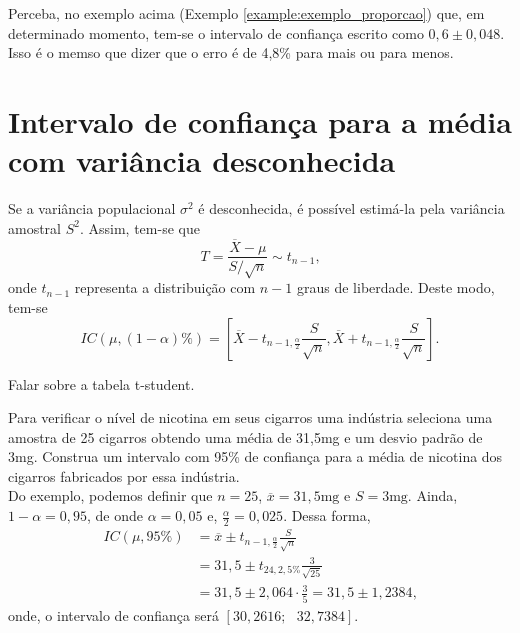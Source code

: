 \documentclass[11pt,fleqn]{book}
\numberwithin{mpicture}{chapter}
\numberwithin{mtable}{chapter}
\numberwithin{mframe}{chapter}
\begin{document}
\begin{remark}
	Perceba, no exemplo acima (Exemplo \ref{example:exemplo_proporcao}) que, em determinado momento, tem-se o intervalo de confiança escrito como $0,6\pm 0,048$. Isso é o memso que dizer que o erro é de 4,8\% para mais ou para menos.
\end{remark}

\section{Intervalo de confiança para a média com variância desconhecida}

Se a variância populacional $\sigma^2$ é desconhecida, é possível estimá-la pela variância amostral $S^2$. Assim, tem-se que
\[
	T=\frac{\overline{X}-\mu}{S/\sqrt{n}} \sim t_{n-1}\text{,}
\]
onde $t_{n-1}$ representa a distribuição  com $n-1$ graus de liberdade. Deste modo, tem-se
\[
	IC(\mu, (1-\alpha)\%) = \left [
		\overline{X} - t_{n-1,\frac{\alpha}{2}}\frac{S}{\sqrt{n}}
		,
		\overline{X} + t_{n-1,\frac{\alpha}{2}}\frac{S}{\sqrt{n}}
	\right ]
	\text{.}
\]

{\color{red}Falar sobre a tabela t-student.}

\begin{example}
	Para verificar o nível de nicotina em seus cigarros uma indústria seleciona uma amostra de 25 cigarros obtendo uma média de 31,5mg e um desvio padrão de 3mg. Construa um intervalo com 95\% de confiança para a média de nicotina dos cigarros fabricados por essa indústria.\\
	
	Do exemplo, podemos definir que $n=25$, $\overline{x}=31,5\text{mg}$ e $S=3\text{mg}$. Ainda, $1-\alpha=0,95$, de onde $\alpha=0,05$ e, $\frac{\alpha}{2}=0,025$. Dessa forma,
	\begin{align*}
		IC(\mu,95\%)&=\overline{x}\pm t_{n-1,\frac{\alpha}{2}}\frac{S}{\sqrt{n}}\\
					&=31,5\pm t_{24,2,5\%}\frac{3}{\sqrt{25}}\\
					&=31,5\pm 2,064\cdot \frac{3}{5}=31,5\pm 1,2384\text{,}
	\end{align*}
	onde, o intervalo de confiança será $[30,2616;\text{ }32,7384]$.
\end{example}
\end{document}
